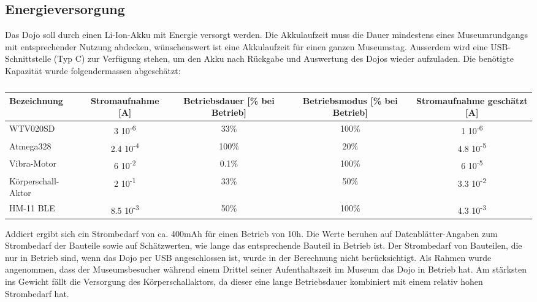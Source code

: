 \subsection{Energieversorgung}
Das Dojo soll durch einen Li-Ion-Akku mit Energie versorgt werden. Die Akkulaufzeit muss die Dauer mindestens eines Museumrundgangs mit entsprechender Nutzung abdecken, wünschenswert ist eine Akkulaufzeit für einen ganzen Museumstag. Ausserdem wird eine USB-Schnittstelle (Typ C) zur Verfügung stehen, um den Akku nach Rückgabe und Auswertung des Dojos wieder aufzuladen. Die benötigte Kapazität wurde folgendermassen abgeschätzt:
\begin{table}[H]
	\centering
	\begin{adjustbox}{max width=\textwidth}
	\begin{tabular}{l|c|c|c|c}
	\hline
	\textbf{Bezeichnung} & \textbf{Stromaufnahme {[}A{]}} & \textbf{Betriebsdauer {[}\% bei Betrieb{]}} & \textbf{Betriebsmodus {[}\% bei Betrieb{]}} & \textbf{Stromaufnahme geschätzt {[}A{]}} \\
	\hline
	WTV020SD & 3 10\textsuperscript{-6} & 33\% & 100\% & 1 10\textsuperscript{-6} \\
	\hline
	Atmega328 & 2.4 10\textsuperscript{-4} & 100\% & 20\% & 4.8 10\textsuperscript{-5} \\
	\hline
	Vibra-Motor & 6 10\textsuperscript{-2} & 0.1\% & 100\% & 6 10\textsuperscript{-5} \\
	\hline
	Körperschall-Aktor & 2 10\textsuperscript{-1} & 33\% & 50\% & 3.3 10\textsuperscript{-2} \\
	\hline
	HM-11 BLE & 8.5 10\textsuperscript{-3} & 50\% & 100\% & 4.3 10\textsuperscript{-3} \\
	\hline                                                                                               
	\end{tabular}

\end{adjustbox}
\caption{}
\label{tab:energieversorgung}
\end{table}
Addiert ergibt sich ein Strombedarf von ca. 400mAh für einen Betrieb von 10h.
Die Werte beruhen auf Datenblätter-Angaben zum Strombedarf der Bauteile sowie auf Schätzwerten, wie lange das entsprechende Bauteil in Betrieb ist. Der Strombedarf von Bauteilen, die nur in Betrieb sind, wenn das Dojo per USB angeschlossen ist, wurde in der Berechnung nicht berücksichtigt. Als Rahmen wurde angenommen, dass der Museumsbesucher während einem Drittel seiner Aufenthaltszeit im Museum das Dojo in Betrieb hat. Am stärksten ins Gewicht fällt die Versorgung des Körperschallaktors, da dieser eine lange Betriebsdauer kombiniert mit einem relativ hohen Strombedarf hat. 
